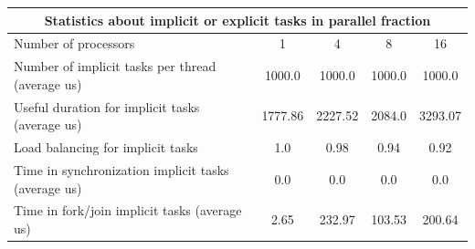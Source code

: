 \begin{tabular}{|l|c|c|c|c|}
\hline
\multicolumn{5}{|c|}{Statistics about implicit or explicit tasks in parallel fraction} \\
\hline
\hline
Number of processors & 1 & 4 & 8 & 16 \\
\hline
\hline
Number of implicit tasks per thread (average us)    &          1000.0 &          1000.0 &          1000.0 &          1000.0 \\
\hline
Useful duration for implicit tasks (average us)     &         1777.86 &         2227.52 &          2084.0 &         3293.07 \\
\hline
Load balancing for implicit tasks                &             1.0 &            0.98 &            0.94 &            0.92 \\
\hline
Time in synchronization implicit tasks (average us) &             0.0 &             0.0 &             0.0 &             0.0 \\
\hline
Time in fork/join implicit tasks (average us)       &            2.65 &          232.97 &          103.53 &          200.64 \\
\hline
\end{tabular}
